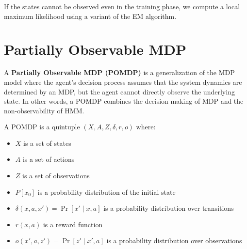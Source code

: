 \documentclass[a4paper, 12pt]{report}
\begin{document}
    If the states cannot be observed even in the training phase, we compute a local maximum likelihood using a variant of the EM algorithm.

    \section{Partially Observable MDP}

    A \textbf{Partially Observable MDP (POMDP)} is a generalization of the MDP model where the agent's decision process assumes that the system dynamics are determined by an MDP, but the agent cannot directly observe the underlying state. In other words, a POMDP combines the decision making of MDP and the non-observability of HMM.

    A POMDP is a quintuple $(X,A,Z,\delta,r,o)$ where:
    \begin{itemize}
        \item $X$ is a set of states
        \item $A$ is a set of actions
        \item $Z$ is a set of observations
        \item $P[x_0]$ is a probability distribution of the initial state
        \item $\delta(x,a,x') = \Pr[x' \mid x,a]$ is a probability distribution over transitions
        \item $r(x,a)$ is a reward function
        \item $o(x',a,z') = \Pr[z' \mid x',a]$ is a probability distribution over observations
    \end{itemize}
\end{document}
